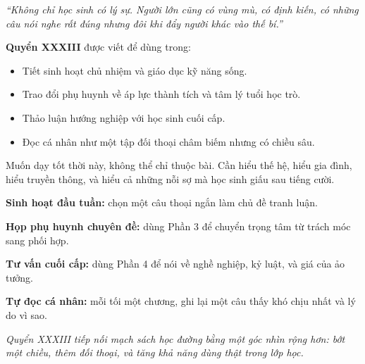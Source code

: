 \begin{minipage}[t]{0.49\textwidth}
\begin{tcolorbox}[
  colback=white,
  colframe=catalogframe,
  boxrule=0.9pt,
  arc=7pt,
  title={Dấu Ấn Của Quyển Này},
  colbacktitle=catalogink,
  coltitle=white,
  fonttitle=\bfseries,
  enhanced
]
{\small\itshape
``Không chỉ học sinh có lý sự. Người lớn cũng có vùng mù, có định kiến, có những câu nói nghe rất đúng nhưng đôi khi đẩy người khác vào thế bí.''}

\vspace{8pt}

\textbf{Quyển XXXIII} được viết để dùng trong:

\begin{itemize}[leftmargin=1.2em]
\item Tiết sinh hoạt chủ nhiệm và giáo dục kỹ năng sống.
\item Trao đổi phụ huynh về áp lực thành tích và tâm lý tuổi học trò.
\item Thảo luận hướng nghiệp với học sinh cuối cấp.
\item Đọc cá nhân như một tập đối thoại châm biếm nhưng có chiều sâu.
\end{itemize}
\end{tcolorbox}

\vspace{8pt}

\begin{tcolorbox}[
  colback=catalogaccent!6,
  colframe=catalogaccent,
  boxrule=1pt,
  arc=7pt,
  title={Thông Điệp Giữ Lại},
  colbacktitle=catalogaccent!88!black,
  coltitle=white,
  fonttitle=\bfseries,
  enhanced
]
{\small
Muốn dạy tốt thời này, không thể chỉ thuộc bài. Cần hiểu thế hệ, hiểu gia đình, hiểu truyền thông, và hiểu cả những nỗi sợ mà học sinh giấu sau tiếng cười.}
\end{tcolorbox}

\vspace{8pt}

\begin{tcolorbox}[
  colback=white,
  colframe=catalogink!60,
  boxrule=0.9pt,
  arc=7pt,
  title={Cách Nối Quyển XXXIII Với Hoạt Động Thực Tế},
  colbacktitle=catalogink!92,
  coltitle=white,
  fonttitle=\bfseries,
  enhanced
]
{\small
\textbf{Sinh hoạt đầu tuần:} chọn một câu thoại ngắn làm chủ đề tranh luận.

\textbf{Họp phụ huynh chuyên đề:} dùng Phần 3 để chuyển trọng tâm từ trách móc sang phối hợp.

\textbf{Tư vấn cuối cấp:} dùng Phần 4 để nói về nghề nghiệp, kỷ luật, và giá của ảo tưởng.

\textbf{Tự đọc cá nhân:} mỗi tối một chương, ghi lại một câu thấy khó chịu nhất và lý do vì sao.
}
\end{tcolorbox}
\end{minipage}

\vfill

\begin{center}
{\footnotesize\itshape\color{catalogink!90} Quyển XXXIII tiếp nối mạch sách học đường bằng một góc nhìn rộng hơn: bớt một chiều, thêm đối thoại, và tăng khả năng dùng thật trong lớp học.}
\end{center}

\clearpage